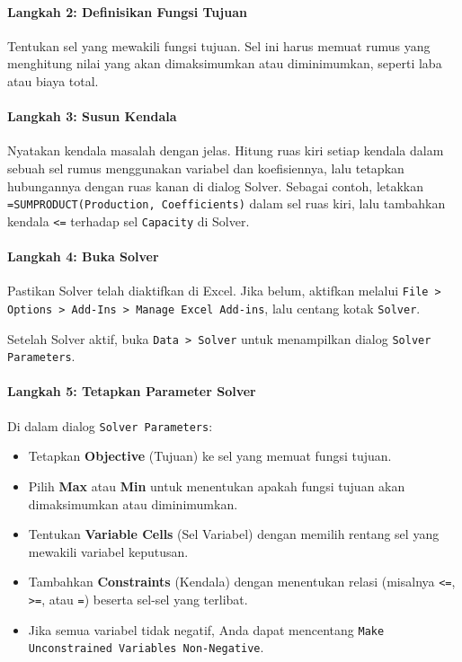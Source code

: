 \paragraph{Langkah 2: Definisikan Fungsi Tujuan}
Tentukan sel yang mewakili fungsi tujuan. Sel ini harus memuat rumus yang menghitung nilai yang akan dimaksimumkan atau diminimumkan, seperti laba atau biaya total.

\paragraph{Langkah 3: Susun Kendala}
Nyatakan kendala masalah dengan jelas. Hitung ruas kiri setiap kendala dalam sebuah sel rumus menggunakan variabel dan koefisiennya, lalu tetapkan hubungannya dengan ruas kanan di dialog Solver. Sebagai contoh, letakkan \texttt{=SUMPRODUCT(Production, Coefficients)} dalam sel ruas kiri, lalu tambahkan kendala \texttt{<=} terhadap sel \texttt{Capacity} di Solver.

\paragraph{Langkah 4: Buka Solver}
Pastikan Solver telah diaktifkan di Excel. Jika belum, aktifkan melalui \texttt{File > Options > Add-Ins > Manage Excel Add-ins}, lalu centang kotak \texttt{Solver}.

Setelah Solver aktif, buka \texttt{Data > Solver} untuk menampilkan dialog \texttt{Solver Parameters}.
{\centering
{}\par{}\label{fig:excel-solver-button}%
\par}

\paragraph{Langkah 5: Tetapkan Parameter Solver}
Di dalam dialog \texttt{Solver Parameters}:
\begin{itemize}
    \item Tetapkan \textbf{Objective} (Tujuan) ke sel yang memuat fungsi tujuan.
    \item Pilih \textbf{Max} atau \textbf{Min} untuk menentukan apakah fungsi tujuan akan dimaksimumkan atau diminimumkan.
    \item Tentukan \textbf{Variable Cells} (Sel Variabel) dengan memilih rentang sel yang mewakili variabel keputusan.
    \item Tambahkan \textbf{Constraints} (Kendala) dengan menentukan relasi (misalnya \texttt{<=}, \texttt{>=}, atau \texttt{=}) beserta sel-sel yang terlibat.
    \item Jika semua variabel tidak negatif, Anda dapat mencentang \texttt{Make Unconstrained Variables Non-Negative}.
\end{itemize}

